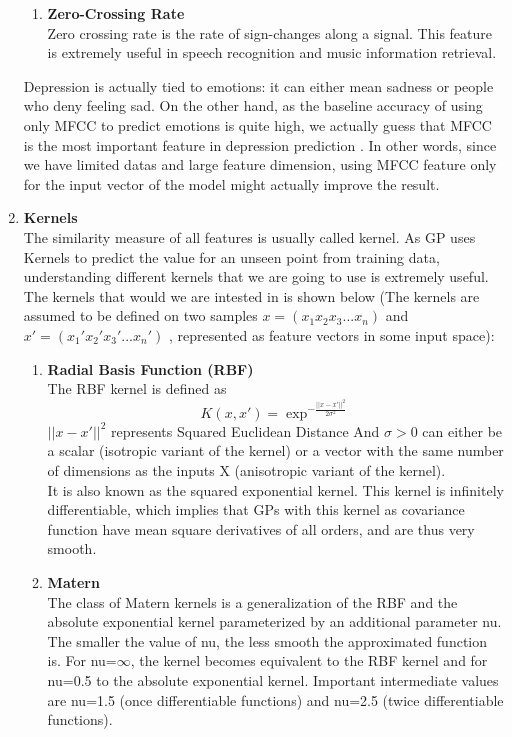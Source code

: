 \documentclass{article}
\begin{document}
\begin{enumerate}
\begin{enumerate}
			\item \textbf{Zero-Crossing Rate} \\
			Zero crossing rate is the rate of sign-changes along a signal. This feature is extremely useful in speech recognition and music information retrieval.
		\end{enumerate}
	
	Depression is actually tied to emotions: it can either mean sadness or people who deny feeling sad. \cite{Stratou2015} 
	On the other hand, as the baseline accuracy of using only MFCC to predict emotions is quite high, 
	we actually guess that MFCC is the most important feature in depression prediction \cite{ElAyadi2011}. 
	In other words, since we have limited datas and large feature dimension, 
	using MFCC feature only for the input vector of the model might actually improve the result.
		
		\item \textbf{Kernels}	\\
		The similarity measure of all features is usually called kernel. As GP uses Kernels to predict the value for an unseen point from training data, 
		understanding different kernels that we are going to use is extremely useful. \\
		The kernels that would we are intested in is shown below 
		(The kernels are assumed to be defined on two samples \( x = ( x_{1} x_{2} x_{3} ... x_{n} ) \) and 
		\( x' = ( {x_{1}}' {x_{2}}' {x_{3}}' ... {x_{n}}')\) ,  
		represented as feature vectors in some input space):
		\begin{enumerate}
			\item \textbf{Radial Basis Function (RBF)}\\
			The RBF kernel is defined as 
			\begin{equation}\label{eq:kernel_rbf}
				K(x,x') = \exp^{-\frac{||x-x'||^{2}}{2\sigma^{2}}}
			\end{equation}
			\(||x-x'||^{2}\) represents Squared Euclidean Distance 
			And \( \sigma > 0 \) can either be a scalar (isotropic variant of the kernel) or a vector with the same number of dimensions 
			as the inputs X (anisotropic variant of the kernel). \\
			It is also known as the squared exponential kernel. This kernel is infinitely differentiable, 
			which implies that GPs with this kernel as covariance function have mean square derivatives of all orders, 
			and are thus very smooth.
			
			\item \textbf{Matern}\\
			The class of Matern kernels is a generalization of the RBF and the absolute exponential kernel parameterized 
			by an additional parameter nu. The smaller the value of nu, the less smooth the approximated function is. For nu=\(\infty\), 
			the kernel becomes equivalent to the RBF kernel and for nu=0.5 to the absolute exponential kernel. 
			Important intermediate values are nu=1.5 (once differentiable functions) and nu=2.5 (twice differentiable functions).


\end{enumerate}
\end{enumerate}
\end{document}
